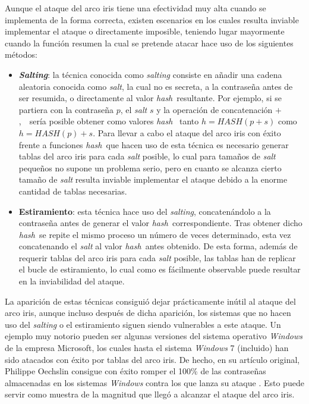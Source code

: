 \documentclass[12pt,spanish,listoffigures,listoftables]{tfgetsinf}
\newcommand{\hash}{\textit{hash}}
\begin{document}
Aunque el ataque del arco iris tiene una efectividad muy alta cuando se implementa de la forma correcta, existen escenarios en los cuales resulta inviable implementar el ataque o directamente imposible, teniendo lugar mayormente cuando la función resumen la cual se pretende atacar hace uso de los siguientes métodos:

\begin{itemize}

    \item \textbf{\textit{Salting}}: la técnica conocida como \textit{salting} consiste en añadir una cadena aleatoria conocida como \textit{salt}, la cual no es secreta, a la contraseña antes de ser resumida, o directamente al valor \hash~resultante. Por ejemplo, si se partiera con la contraseña $p$, el \textit{salt} $s$ y la operación de concatenación $+$,~~sería posible obtener como valores \hash~ tanto $h = HASH(p+s)$ como $h = HASH(p)+s$. Para llevar a cabo el ataque del arco iris con éxito frente a funciones \hash~que hacen uso de esta técnica es necesario generar tablas del arco iris para cada \textit{salt} posible, lo cual para tamaños de \textit{salt} pequeños no supone un problema serio, pero en cuanto se alcanza cierto tamaño de \textit{salt} resulta inviable implementar el ataque debido a la enorme cantidad de tablas necesarias.
    
    \item \textbf{Estiramiento}: esta técnica hace uso del \textit{salting}, concatenándolo a la contraseña antes de generar el valor \hash~correspondiente. Tras obtener dicho \hash~se repite el mismo proceso un número de veces determinado, esta vez concatenando el \textit{salt} al valor \hash~antes obtenido. De esta forma, además de requerir tablas del arco iris para cada \textit{salt} posible, las tablas han de replicar el bucle de estiramiento, lo cual como es fácilmente observable puede resultar en la inviabilidad del ataque.
    
\end{itemize}

La aparición de estas técnicas consiguió dejar prácticamente inútil al ataque del arco iris, aunque incluso después de dicha aparición, los sistemas que no hacen uso del \textit{salting} o el estiramiento siguen siendo vulnerables a este ataque. Un ejemplo muy notorio pueden ser algunas versiones del sistema operativo \textit{Windows} de la empresa Microsoft, los cuales hasta el sistema \textit{Windows} 7 (incluido) han sido atacados con éxito por tablas del arco iris. De hecho, en su artículo original, Philippe Oechslin consigue con éxito romper el 100\% de las contraseñas almacenadas en los sistemas \textit{Windows} contra los que lanza su ataque \cite{rainbow}. Esto puede servir como muestra de la magnitud que llegó a alcanzar el ataque del arco iris.
\end{document}
